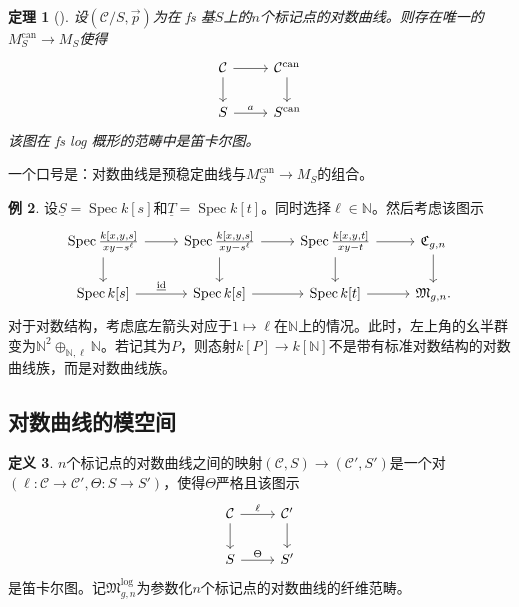 \documentclass{amsart}
\newtheorem{thm}{定理}[section]
\theoremstyle{definition}
\newtheorem{defn}[thm]{定义}
\newtheorem{exm}[thm]{例}
\theoremstyle{remark}
\theoremstyle{plain}
\theoremstyle{definition}
\theoremstyle{remark}
\newcommand{\N}{\mathbb{N}}
\newcommand{\mc}[1]{\mathcal{#1}}
\newcommand{\mf}[1]{\mathfrak{#1}}
\newcommand{\on}[1]{\operatorname{#1}}
\newcommand{\ul}[1]{\underline{#1}}
\newcommand{\1}{\mathbf{1}}
\newcommand{\2}{\mathbf{2}}
\newcommand{\3}{\mathbf{3}}
\DeclareMathOperator{\Spec}{Spec}
\begin{document}
\begin{thm}[{\cite{FKato2000}}]
设\((\mc{C}/S, \vec{p})\)为在 fs 基\(S\)上的\(n\)个标记点的对数曲线。则存在唯一的\(M_S^{\on{can}} \to M_S\)使得
    \begin{equation*}
    \begin{tikzcd}
        \mc{C} \ar{d} \ar{r} & \mc{C}^{\on{can}} \ar{d} \\
        S \ar{r}{a} & S^{\on{can}}
    \end{tikzcd}
    \end{equation*}
该图在 fs log 概形的范畴中是笛卡尔图。
\end{thm}

一个口号是：对数曲线是预稳定曲线与\(M_S^{\on{can}} \to M_S\)的组合。

\begin{exm}
设\(\ul{S} = \Spec k[s]\)和\(\ul{T} = \Spec k[t]\)。同时选择\(\ell \in \N\)。然后考虑该图示
    \begin{equation*}
    \begin{tikzcd}
        \Spec \frac{k{ [x,y,s] }}{xy-s^{\ell}} \ar{d} \ar{r} & \Spec \frac{k{ [x,y,s] }}{xy-s^{\ell}} \ar{d} \ar{r} & \Spec  \frac{k{[x,y,t]}}{xy-t} \ar{r}\ar{d} & \mf{C}_{g,n} \ar{d} \\
        \Spec k{[s]} \ar{r}{\ul{ \on{id} }} & \Spec {k[s]} \ar{r} & \Spec k{[t]} \ar{r} & \mf{M}_{g,n}.
    \end{tikzcd}
    \end{equation*}
    对于对数结构，考虑底左箭头对应于\(1 \mapsto \ell\)在\(\N\)上的情况。此时，左上角的幺半群变为\(\N^2 \oplus_{\N, \ell} \N\)。若记其为\(P\)，则态射\(k[P] \to k[\N]\)不是带有标准对数结构的对数曲线族，而是对数曲线族。
\end{exm}

\subsection{对数曲线的模空间}%
\label{sub:Moduli of log curves}

\begin{defn}
\(n\)个标记点的对数曲线之间的映射\((\mc{C}, S) \to (\mc{C}', S')\)是一个对\((\ell \colon \mc{C} \to \mc{C}', \Theta \colon S \to S')\)，使得\(\Theta\)严格且该图示
    \begin{equation*}
    \begin{tikzcd}
        \mc{C} \ar{d} \ar{r}{\ell} & \mc{C}' \ar{d} \\
        S \ar{r}{\Theta} & S'
    \end{tikzcd}
    \end{equation*}
是笛卡尔图。记\(\mf{M}_{g,n}^{\log}\)为参数化\(n\)个标记点的对数曲线的纤维范畴。
\end{defn}
\end{document}
